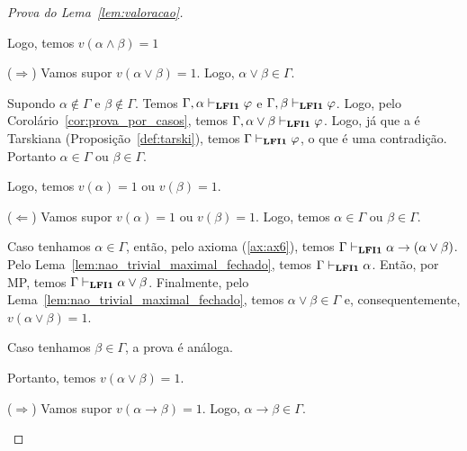 \begin{proof}[Prova do Lema~\ref{lem:valoracao}]
\begin{provaporcasos}
\begin{adjustwidth}{1cm}{}
                        Logo, temos $v(\alpha \land \beta) = 1$

                    \end{adjustwidth}


                    \begin{adjustwidth}{1cm}{}
                        \noindent ($\Longrightarrow$) Vamos supor $v(\alpha \lor \beta) = 1$. Logo, $\alpha \lor \beta \in \Gamma$.

                        \noindent Supondo $\alpha \notin \Gamma$ e $\beta \notin \Gamma$. Temos $\Gamma, \alpha \vdash_{{\normalfont\textbf{LFI1}}{}} \varphi$ e $\Gamma, \beta \vdash_{{\normalfont\textbf{LFI1}}{}} \varphi$. Logo, pelo Corolário~\ref{cor:prova_por_casos}, temos $\Gamma, \alpha \lor \beta \vdash_{{\normalfont\textbf{LFI1}}{}} \varphi$. Logo, já que a \lfium{} é Tarskiana (Proposição~\ref{def:tarski}), temos $\Gamma \vdash_{{\normalfont\textbf{LFI1}}{}} \varphi$, o que é uma contradição. Portanto $\alpha \in \Gamma$ ou $\beta \in \Gamma$.
                        
                        \noindent Logo, temos $v(\alpha) = 1$ ou $v(\beta) = 1$.

                        \noindent ($\Longleftarrow$) Vamos supor $v(\alpha) = 1$ ou $v(\beta) = 1$. Logo, temos $\alpha \in \Gamma$ ou $\beta \in \Gamma$.

                        \noindent Caso tenhamos $\alpha \in \Gamma$, então, pelo axioma (\ref{ax:ax6}), temos $\Gamma \vdash_{{\normalfont\textbf{LFI1}}{}} \alpha \to (\alpha \lor \beta)$. Pelo Lema~\ref{lem:nao_trivial_maximal_fechado}, temos $\Gamma \vdash_{{\normalfont\textbf{LFI1}}{}} \alpha$. Então, por MP, temos $\Gamma \vdash_{{\normalfont\textbf{LFI1}}{}} \alpha \lor \beta$. Finalmente, pelo Lema~\ref{lem:nao_trivial_maximal_fechado}, temos $\alpha \lor \beta \in \Gamma$ e, consequentemente, $v(\alpha \lor \beta) = 1$.

                        \noindent Caso tenhamos $\beta \in \Gamma$, a prova é análoga.

                        \noindent Portanto, temos $v(\alpha \lor \beta) = 1$.

                    \end{adjustwidth}


                        \begin{adjustwidth}{1cm}{}
                            
                            \noindent ($\Longrightarrow$) Vamos supor $v(\alpha \to \beta) = 1$. Logo, $\alpha \to \beta \in \Gamma$.


\end{adjustwidth}
\end{provaporcasos}
\end{proof}
